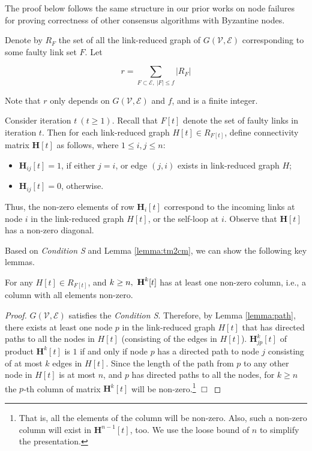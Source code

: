 \documentclass{llncs}
\newcommand{\fillbox}{\hspace*{\fill}\(\Box\)}
\newcommand{\scripte}{\mathcal{E}}
\newcommand{\scriptv}{\mathcal{V}}
\newcommand{\graphh}{\textit{H}}
\newcommand{\matrixh}{\textbf{H}}
\begin{document}
The proof below follows the same structure in our prior works on node failures \cite{Tseng_general,vaidya_icdcn14} for proving correctness of other consensus algorithms with Byzantine nodes.

Denote by $R_F$ the set of all the link-reduced graph of $G(\scriptv, \scripte)$ corresponding to some faulty link set $F$. Let

\[
r = \sum_{F \subset \scripte,~|F| \leq f} |R_F|
\]

Note that $r$ only depends on $G(\scriptv, \scripte)$ and $f$, and is a finite integer.

Consider iteration $t~(t\geq 1)$. Recall that $F[t]$ denote the set of faulty links in iteration $t$. Then for each link-reduced graph $\graphh[t] \in R_{F[t]}$, define connectivity matrix $\matrixh[t]$ as follows, where $1 \leq i,j \leq n$:

\begin{itemize}
\item $\matrixh_{ij}[t] = 1$, if either $j = i$, or edge $(j,i)$ exists in link-reduced graph $\graphh$;
\item $\matrixh_{ij}[t] = 0$, otherwise.
\end{itemize}

Thus, the non-zero elements of row $\matrixh_i[t]$ correspond to the incoming links at node $i$ in the link-reduced graph $\graphh[t]$, or the self-loop at $i$. Observe that $\matrixh[t]$ has a non-zero diagonal.


Based on {\em Condition S} and Lemma \ref{lemma:tm2cm}, we can show the following key lemmas. 


\begin{lemma}
\label{lemma:non-zero}
For any $\graphh[t] \in R_{F[t]}$, and $k \geq n,~{\normalfont\bf \matrixh}^{k}[t]$ has at least one non-zero column, i.e., a column with all elements non-zero.
\end{lemma}



\begin{proof}
$G(\scriptv,\scripte)$ satisfies the {\em Condition S}. Therefore, by Lemma \ref{lemma:path},
there exists at least one node $p$ in the link-reduced graph $\graphh[t]$ that has directed paths to all the nodes in $\graphh[t]$ (consisting of the edges in $\graphh[t]$). $\matrixh^k_{jp}[t]$ of product $\matrixh^k[t]$ is $1$ if and only if node $p$ has a directed path to node $j$ consisting of at most $k$ edges in $\graphh[t]$. Since the length of the path from $p$ to any other node in $\graphh[t]$ is at most $n$, and $p$ has directed paths to all the nodes, for $k \geq n$ the $p$-th column of matrix $\matrixh^{k}[t]$ will be non-zero.\footnote{That is, all the elements of the column will be non-zero. Also, such a non-zero column will exist in $\matrixh^{n-1}[t]$, too. We use the loose bound of $n$ to simplify the presentation.} 
\fillbox
\end{proof}
\end{document}
